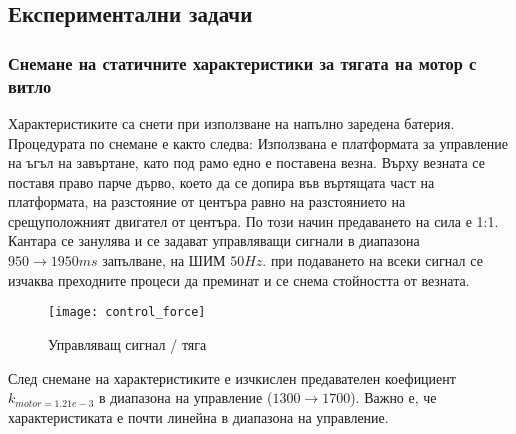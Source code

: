 \FloatBarrier

\subsection{Експериментални задачи}

\subsubsection{Снемане на статичните характеристики за тягата на мотор с витло}

Характеристиките са снети при използване на напълно заредена батерия.
Процедурата по снемане е както следва:
Използвана е платформата за управление на ъгъл на завъртане,
като под рамо едно е поставена везна. Върху везната се поставя право парче дърво, което да се допира във въртящата част на платформата,
на разстояние от центъра равно на разстоянието на срещуположният двигател от центъра. 
По този начин предаването на сила е 1:1.
Кантара се занулява и се задават управляващи сигнали в диапазона \(950 \to 1950ms\) запълване,
на ШИМ \(50Hz\). при подаването на всеки сигнал се изчаква преходните процеси да преминат и се снема стойността от везната.

\begin{figure}[htpb!]
    \centering
    \texttt{[image: control\_force]}
    \caption{Управляващ сигнал / тяга}
    \label{fig:control_force}
\end{figure}

След снемане на характеристиките е изчкислен предавателен коефициент \(k_{motor=1.21e-3}\) в диапазона на управление (\(1300\to1700\)).
Важно е, че характеристиката е почти линейна в диапазона на управление.








